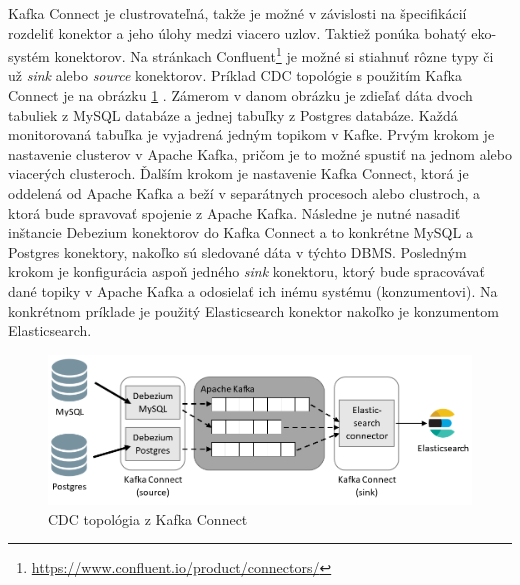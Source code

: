 Kafka Connect je clustrovateľná, takže je možné v závislosti na špecifikácií rozdeliť konektor a jeho úlohy medzi viacero uzlov. Taktiež ponúka bohatý eko-systém konektorov. Na stránkach Confluent\footnote{\url{https://www.confluent.io/product/connectors/}} je možné si stiahnuť rôzne typy či už \textit{sink} alebo \textit{source} konektorov.
Príklad CDC topológie s použitím Kafka Connect je na obrázku \ref{fig:CDC_topology} \cite{debezium:devoxx}. Zámerom v danom obrázku je zdieľať dáta dvoch tabuliek z MySQL databáze a jednej tabuľky z Postgres databáze. Každá monitorovaná tabuľka je vyjadrená jedným topikom v Kafke. Prvým krokom je nastavenie clusterov v Apache Kafka, pričom je to možné spustiť na jednom alebo viacerých clusteroch. Ďalším krokom je nastavenie Kafka Connect, ktorá je oddelená od Apache Kafka a beží v separátnych procesoch alebo clustroch, a ktorá bude spravovať spojenie z Apache Kafka. Následne je nutné nasadiť inštancie Debezium konektorov do Kafka Connect a to konkrétne MySQL a Postgres konektory, nakoľko sú sledované dáta v týchto DBMS. Posledným krokom je konfigurácia aspoň jedného \textit{sink} konektoru, ktorý bude spracovávať dané topiky v Apache Kafka a odosielať ich inému systému (konzumentovi). Na konkrétnom príklade je použitý Elasticsearch konektor nakoľko je konzumentom Elasticsearch.

\begin{figure}[H]
\begin{center}
\includegraphics[width=15cm]{figures/CDC_topology.PNG}
\caption{CDC topológia z Kafka Connect}
\label{fig:CDC_topology}
\end{center}
\end{figure}

